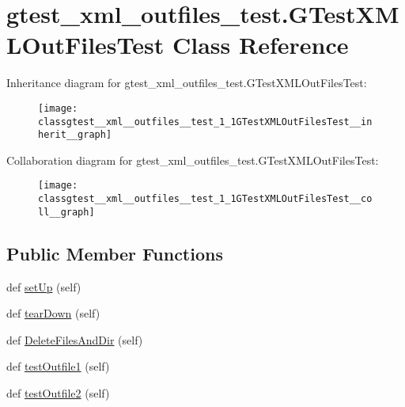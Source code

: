 \hypertarget{classgtest__xml__outfiles__test_1_1GTestXMLOutFilesTest}{}\section{gtest\+\_\+xml\+\_\+outfiles\+\_\+test.\+G\+Test\+X\+M\+L\+Out\+Files\+Test Class Reference}
\label{classgtest__xml__outfiles__test_1_1GTestXMLOutFilesTest}


Inheritance diagram for gtest\+\_\+xml\+\_\+outfiles\+\_\+test.\+G\+Test\+X\+M\+L\+Out\+Files\+Test\+:
\nopagebreak
\begin{figure}[H]
\begin{center}
\leavevmode
\texttt{[image: classgtest\_\_xml\_\_outfiles\_\_test\_1\_1GTestXMLOutFilesTest\_\_inherit\_\_graph]}
\end{center}
\end{figure}


Collaboration diagram for gtest\+\_\+xml\+\_\+outfiles\+\_\+test.\+G\+Test\+X\+M\+L\+Out\+Files\+Test\+:
\nopagebreak
\begin{figure}[H]
\begin{center}
\leavevmode
\texttt{[image: classgtest\_\_xml\_\_outfiles\_\_test\_1\_1GTestXMLOutFilesTest\_\_coll\_\_graph]}
\end{center}
\end{figure}
\subsection*{Public Member Functions}
\begin{DoxyCompactItemize}
\item 
def \hyperlink{classgtest__xml__outfiles__test_1_1GTestXMLOutFilesTest_a56550f293277d18c36e868a637fe1153}{set\+Up} (self)
\item 
def \hyperlink{classgtest__xml__outfiles__test_1_1GTestXMLOutFilesTest_a49d1d410370ba8a3cfcc281eaadb5706}{tear\+Down} (self)
\item 
def \hyperlink{classgtest__xml__outfiles__test_1_1GTestXMLOutFilesTest_a503d2fbc9cd782ae57ac4307d2db43e1}{Delete\+Files\+And\+Dir} (self)
\item 
def \hyperlink{classgtest__xml__outfiles__test_1_1GTestXMLOutFilesTest_a034738bbc00ac46d00f183402c561228}{test\+Outfile1} (self)
\item 
def \hyperlink{classgtest__xml__outfiles__test_1_1GTestXMLOutFilesTest_a3c02687f092a482d0d0260c7ed94c618}{test\+Outfile2} (self)
\end{DoxyCompactItemize}
